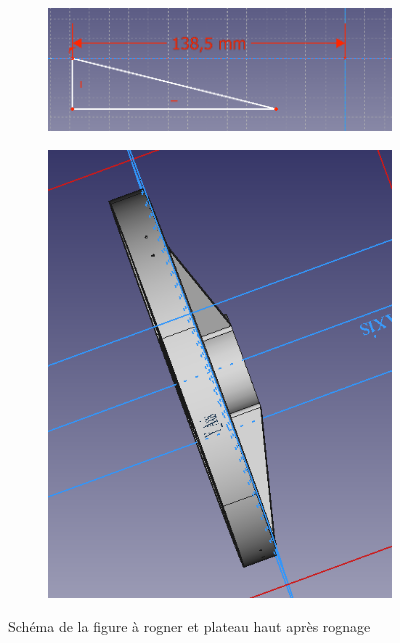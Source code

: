 \documentclass[a4paper,12pt]{article}
\begin{document}
\begin{figure}[H]
    \centering
    \begin{subfigure}[]{0.4\textwidth}
        \includegraphics[width=\textwidth]{triangle.png}
    \end{subfigure}
    \begin{subfigure}[]{0.3\textwidth}
        \includegraphics[width=\textwidth]{plat haut final.png}
    \end{subfigure}
    \caption{Schéma de la figure à rogner et plateau haut après rognage}
\end{figure}
\end{document}
